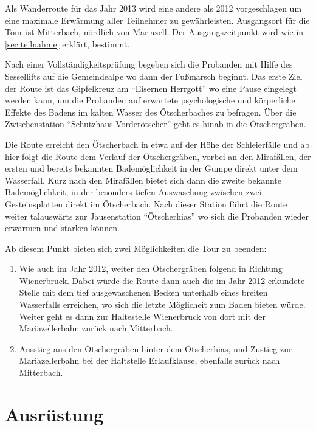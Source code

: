 \documentclass[twoside]{article}
\begin{document}
\begin{multicols}{2}
Als Wanderroute für das Jahr 2013 wird eine andere als 2012 vorgeschlagen um eine maximale Erwärmung aller Teilnehmer zu gewährleisten. Ausgangsort für die Tour
ist Mitterbach, nördlich von Mariazell. Der Ausgangszeitpunkt wird wie in
\cref{sec:teilnahme} erklärt, bestimmt.

Nach einer Vollständigkeitsprüfung begeben sich die Probanden mit Hilfe des
Sessellifts auf die Gemeindealpe wo dann der Fußmarsch beginnt. Das erste Ziel der
Route ist das Gipfelkreuz am "`Eisernen Herrgott"' wo eine Pause eingelegt werden kann, um die Probanden auf erwartete psychologische und körperliche
Effekte des Badens im kalten Wasser des Ötscherbaches zu befragen. Über die Zwischenstation "`Schutzhaus Vorderötscher"' geht es hinab in die Ötschergräben.

Die Route erreicht den Ötscherbach in etwa auf der Höhe der Schleierfälle und ab hier folgt die Route dem Verlauf der Ötschergräben, vorbei an den Mirafällen,
der ersten und bereits bekannten Bademöglichkeit in der Gumpe direkt unter dem Wasserfall. Kurz nach den Mirafällen bietet sich dann die zweite bekannte
Bademöglichkeit, in der besonders tiefen Auswaschung zwischen zwei Gesteinsplatten direkt im Ötscherbach. Nach dieser Station führt die Route weiter talauswärts
zur Jausenstation "`Ötscherhias"' wo sich die Probanden wieder erwärmen und stärken können.

Ab diesem Punkt bieten sich zwei Möglichkeiten die Tour zu beenden:

\begin{enumerate}
    \item Wie auch im Jahr 2012, weiter den Ötschergräben folgend in Richtung Wienerbruck. Dabei würde die Route dann auch die im Jahr 2012 erkundete Stelle mit
        dem tief ausgewaschenen Becken unterhalb eines breiten Wasserfalls erreichen, wo sich die letzte Möglicheit zum Baden bieten würde. Weiter geht es dann
        zur Haltestelle Wienerbruck von dort mit der Mariazellerbahn zurück nach Mitterbach.
    \item Ausstieg aus den Ötschergräben hinter dem Ötscherhias, und Zustieg zur Mariazellerbahn bei der Haltstelle Erlaufklause, ebenfalls zurück nach
        Mitterbach.
\end{enumerate}


\section{Ausrüstung}


\end{multicols}
\end{document}
